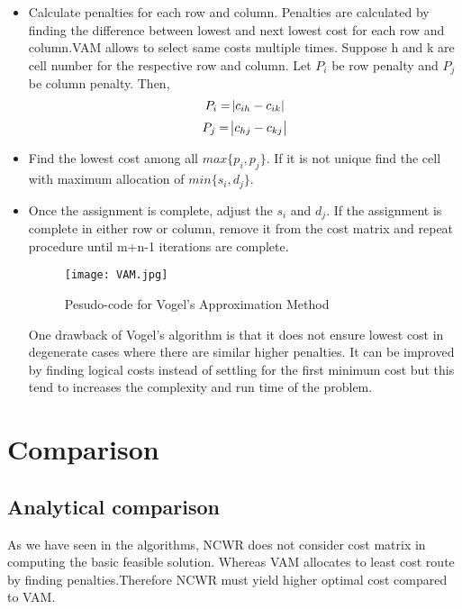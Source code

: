 \documentclass[12pt]{article}
\theoremstyle{definition}
\theoremstyle{definition}
\numberwithin{equation}{section}
\begin{document}
\begin{itemize}
\item Calculate penalties for each row and column. Penalties are calculated by finding the difference between lowest and next lowest cost for each row and column.VAM allows to select same costs multiple times. Suppose h and k are cell number for the respective row and column. Let $P_{i}$ be row penalty and $P_{j}$ be column penalty. Then,
$$P_{i}=\abs{c_{ih}-c_{ik}}$$
$$P_{j}=\abs{c_{hj}-c_{kj}}$$
\item Find the lowest cost among all $max\big \{p_{i},p_{j} \big \}$. If it is not unique find the cell with maximum allocation of $min\big \{s_{i},d_{j} \big \}.$
\item Once the assignment is complete, adjust the $s_{i}$ and $d_{j}$. If the assignment is complete in either row or column, remove it from the cost matrix and repeat procedure until m+n-1 iterations are complete.

\begin{figure}[h]
\texttt{[image: VAM.jpg]}
\caption{Pesudo-code for Vogel's Approximation Method }
\end{figure}

One drawback of Vogel's algorithm is that it does not ensure lowest cost in degenerate cases where there are similar higher penalties\cite{a6}. It can be improved by finding logical costs instead of settling for the first minimum cost but this tend to increases the complexity and run time of the problem.  

\end{itemize}

\section{Comparison}
\subsection{Analytical comparison}
As we have seen in the algorithms, NCWR does not consider cost matrix in computing the basic feasible solution. Whereas VAM allocates to least cost route by finding penalties.Therefore NCWR must yield higher optimal cost compared to VAM. \\
\end{document}
